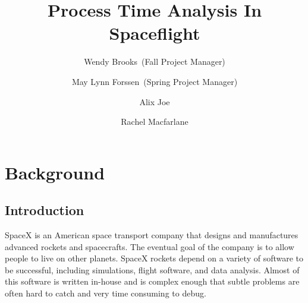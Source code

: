 \documentclass{hmcclinic}
\title{Process Time Analysis In Spaceflight}
\author{Wendy Brooks~(Fall Project Manager) \and May Lynn Forssen~(Spring Project Manager) \and Alix Joe \and
Rachel Macfarlane}
\begin{document}

\maketitle




\chapter{Background} %
\section{Introduction}
SpaceX is an American space transport company that designs and manufactures
advanced rockets and spacecrafts. The eventual goal of the company is to allow
people to live on other planets. SpaceX rockets depend on a variety of software
to be successful, including simulations, flight software, and data analysis.
Almost of this software is written in-house and is complex enough that subtle
problems are often hard to catch and very time consuming to debug.

\end{document}
